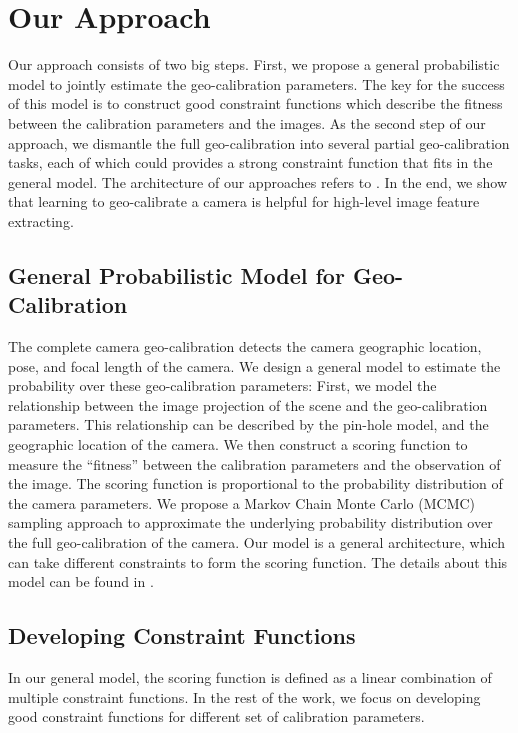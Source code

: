 \section{Our Approach}
Our approach consists of two big steps. First, we propose a general
probabilistic model to jointly estimate the geo-calibration
parameters. The key for the success of this model is to construct good
constraint functions which describe the fitness between the calibration
parameters and the images. As the second step of our approach, we
dismantle the full geo-calibration into several partial
geo-calibration tasks, each of which could provides a strong constraint
function that fits in the general model. The architecture of
our approaches refers to .
%
In the end, we show that learning to geo-calibrate a camera is helpful
for high-level image feature extracting.


\subsection{General Probabilistic Model for Geo-Calibration}
The complete camera geo-calibration detects the camera
geographic location, pose, and focal length of the camera.  We
design a general model to estimate the probability over these
geo-calibration parameters: First, we model the relationship between the
image projection of the scene and the geo-calibration parameters. This
relationship can be described by the pin-hole model, and
the geographic location of the camera.
We then construct a scoring function to measure the ``fitness'' between the
calibration parameters and the observation of the image. 
The scoring function is proportional to the probability distribution
of the camera parameters. We propose a Markov Chain Monte
Carlo (MCMC) sampling approach to approximate the underlying
probability distribution over the full geo-calibration of the camera.
Our model is a general architecture, which can take different
constraints to form the scoring function. The details about this model
can be found in .

\subsection{Developing Constraint Functions}
In our general model, the scoring function is defined as a linear
combination of multiple constraint functions.
In the rest of the work, we focus on developing good constraint
functions for different set of calibration parameters. 

